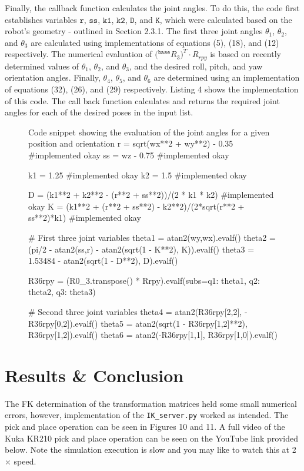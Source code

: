 \documentclass[a4paper]{article}
\begin{document}
Finally, the callback function calculates the joint angles. To do this, the code first establishes variables $\texttt{r}$, $\texttt{ss}$, $\texttt{k1}$, $\texttt{k2}$, $\texttt{D}$, and $\texttt{K}$, which were calculated based on the robot's geometry - outlined in Section 2.3.1. The first three joint angles $\theta_1$, $\theta_2$, and $\theta_3$ are calculated using implementations of equations (5), (18), and (12) respectively. The numerical evaluation of $\big({}^{\texttt{base}}R_3 \big)^T \cdot R_{rpy}$ is based on recently determined values of $\theta_1$, $\theta_2$, and $\theta_3$, and the desired roll, pitch, and yaw orientation angles. Finally, $\theta_4$, $\theta_5$, and $\theta_6$ are determined using an implementation of equations (32), (26), and (29) respectively. Listing 4 shows the implementation of this code. The call back function calculates and returns the required joint angles for each of the desired poses in the input list.

\begin{figure}[h]\footnotesize
	\begin{sexylisting}{Code snippet showing the evaluation of the joint angles for a given position and orientation}
r = sqrt(wx**2 + wy**2) - 0.35 #implemented okay
ss = wz - 0.75 #implemented okay

k1 = 1.25 #implemented okay
k2 = 1.5 #implemented okay

D = (k1**2 + k2**2 - (r**2 + ss**2))/(2 * k1 * k2) #implemented okay
K = (k1**2 + (r**2 + ss**2) - k2**2)/(2*sqrt(r**2 + ss**2)*k1) #implemented okay

# First three joint variables
theta1 = atan2(wy,wx).evalf()
theta2 = (pi/2 - atan2(ss,r) - atan2(sqrt(1 - K**2), K)).evalf()
theta3 = 1.53484 - atan2(sqrt(1 - D**2), D).evalf()

R36rpy = (R0_3.transpose() * Rrpy).evalf(subs={q1: theta1, q2: theta2, q3: theta3})

# Second three joint variables
theta4 = atan2(R36rpy[2,2], -R36rpy[0,2]).evalf()
theta5 = atan2(sqrt(1 - R36rpy[1,2]**2), R36rpy[1,2]).evalf()
theta6 = atan2(-R36rpy[1,1], R36rpy[1,0]).evalf()
	\end{sexylisting}
\end{figure}

\newpage

\section{Results \& Conclusion}
The FK determination of the transformation matrices held some small numerical errors, however, implementation of the \verb|IK_server.py| worked as intended. The pick and place operation can be seen in Figures 10 and 11. A full video of the Kuka KR210 pick and place operation can be seen on the YouTube link provided below. Note the simulation execution is slow and you may like to watch this at 2 $\times$ speed.
\end{document}
